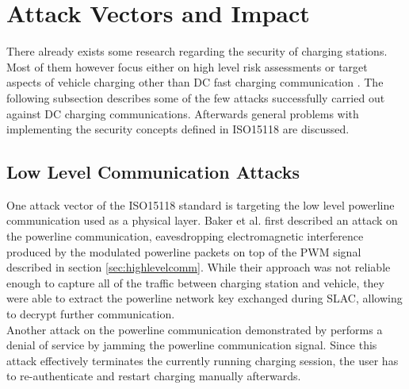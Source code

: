 \documentclass[conference,flushend]{iaria} %
\begin{document}
\section{Attack Vectors and Impact} \label{sec:attackvectors}
There already exists some research regarding the security of charging stations. Most of them however focus either on high level risk assessments \cite{acharya_cybersecurity_2020, sanghvi_cybersecurity_2021, assi_ensuring_2023, mahrukh_load_2023, park_potential_2019, ahalawat_security_2022, bao_threat_2018} or target aspects of vehicle charging other than DC fast charging communication \cite{nasr_chargeprint_2023, sklyar_chargepoint_nodate, sarieddine_investigating_2023, nasr_large-scale_nodate, nasr_power_2022}.
The following subsection describes some of the few attacks successfully carried out against DC charging communications.
Afterwards general problems with implementing the security concepts defined in ISO15118 are discussed.

\subsection{Low Level Communication Attacks}
One attack vector of the ISO15118 standard is targeting the low level powerline communication used as a physical layer.
Baker et al. \cite{baker_losing_2019} first described an attack on the powerline communication, eavesdropping electromagnetic interference produced by the modulated powerline packets on top of the PWM signal described in section \ref{sec:highlevelcomm}.
While their approach was not reliable enough to capture all of the traffic between charging station and vehicle, they were able to extract the powerline network key exchanged during SLAC, allowing to decrypt further communication. \\
Another attack on the powerline communication demonstrated by \cite{kohler_brokenwire_2023} performs a denial of service by jamming the powerline communication signal.
Since this attack effectively terminates the currently running charging session, the user has to re-authenticate and restart charging manually afterwards.
\end{document}
